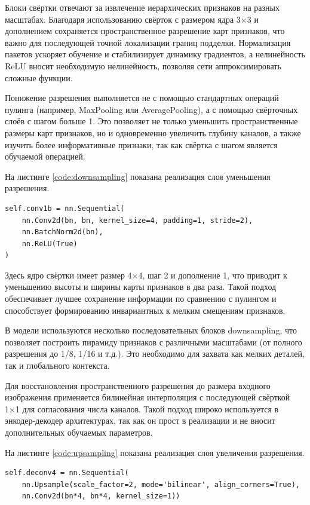 Блоки свёртки отвечают за извлечение иерархических признаков на разных масштабах. Благодаря использованию свёрток с размером ядра 3×3 и дополнением сохраняется пространственное разрешение карт признаков, что важно для последующей точной локализации границ подделки. Нормализация пакетов ускоряет обучение и стабилизирует динамику градиентов, а нелинейность ReLU вносит необходимую нелинейность, позволяя сети аппроксимировать сложные функции.

Понижение разрешения выполняется не с помощью стандартных операций пулинга (например, MaxPooling или AveragePooling), а с помощью свёрточных слоёв с шагом больше 1. Это позволяет не только уменьшить пространственные размеры карт признаков, но и одновременно увеличить глубину каналов, а также изучить более информативные признаки, так как свёртка с шагом является обучаемой операцией.

На листинге \ref{code:downsampling} показана реализация слоя уменьшения разрешения.

\begin{lstlisting}[caption=Листинг 2.2 -- Реализация слоя уменьшения разрешения,label=code:downsampling]
	self.conv1b = nn.Sequential(
    nn.Conv2d(bn, bn, kernel_size=4, padding=1, stride=2),
    nn.BatchNorm2d(bn),
    nn.ReLU(True)
)
\end{lstlisting}

Здесь ядро свёртки имеет размер 4×4, шаг 2 и дополнение 1, что приводит к уменьшению высоты и ширины карты признаков в два раза. Такой подход обеспечивает лучшее сохранение информации по сравнению с пулингом и способствует формированию инвариантных к мелким смещениям признаков.

В модели используются несколько последовательных блоков downsampling, что позволяет построить пирамиду признаков с различными масштабами (от полного разрешения до 1/8, 1/16 и т.д.). Это необходимо для захвата как мелких деталей, так и глобального контекста.

Для восстановления пространственного разрешения до размера входного изображения применяется билинейная интерполяция с последующей свёрткой 1×1 для согласования числа каналов. Такой подход широко используется в энкодер-декодер архитектурах, так как он прост в реализации и не вносит дополнительных обучаемых параметров.

На листинге \ref{code:upsampling} показана реализация слоя увеличения разрешения.

\begin{lstlisting}[caption=Листинг 2.3 -- Реализация слоя увеличения разрешения,label=code:upsampling]
	self.deconv4 = nn.Sequential(
	nn.Upsample(scale_factor=2, mode='bilinear', align_corners=True),
	nn.Conv2d(bn*4, bn*4, kernel_size=1))
\end{lstlisting}

